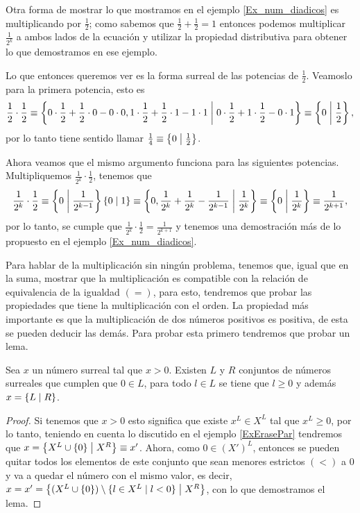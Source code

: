     \begin{example}
        Otra forma de mostrar lo que mostramos en el ejemplo \ref{Ex_num_diadicos} es multiplicando por $\frac{1}{2}$; como sabemos que $\frac{1}{2}+\frac{1}{2} = 1$ entonces podemos multiplicar $\frac{1}{2^k}$ a ambos lados de la ecuaci\'on y utilizar la propiedad distributiva para obtener lo que demostramos en ese ejemplo.

        Lo que entonces queremos ver es la forma surreal de las potencias de $\frac{1}{2}$. Veamoslo para la primera potencia, esto es
        \[
            \frac{1}{2}\cdot\frac{1}{2} \equiv \left\{0\cdot\frac{1}{2} + \frac{1}{2}\cdot 0 - 0\cdot 0, 1\cdot \frac{1}{2} +\frac{1}{2}\cdot 1 - 1\cdot 1\;\middle|\; 0\cdot \frac{1}{2} + 1\cdot \frac{1}{2} - 0\cdot 1\right\} \equiv \left\{0\;\middle|\; \frac{1}{2}\right\},
        \]
        por lo tanto tiene sentido llamar $\frac{1}{4}\equiv \left\{0\;\middle|\; \frac{1}{2}\right\}$.

        Ahora veamos que el mismo argumento funciona para las siguientes potencias. Multipliquemos $\frac{1}{2^k}\cdot \frac{1}{2}$, tenemos que 
        \[
            \frac{1}{2^k}\cdot \frac{1}{2} \equiv \left\{0\;\middle|\; \frac{1}{2^{k-1}}\right\}\left\{0\;\middle|\; 1\right\} \equiv \left\{0, \frac{1}{2^{k}} + \frac{1}{2^{k}} - \frac{1}{2^{k-1}}\;\middle|\; \frac{1}{2^{k}}\right\}\equiv \left\{0\;\middle|\; \frac{1}{2^{k}}\right\}\equiv \frac{1}{2^{k+1}},
        \]
        por lo tanto, se cumple que $\frac{1}{2^k}\cdot \frac{1}{2} = \frac{1}{2^{k+1}}$ y tenemos una demostraci\'on m\'as de lo propuesto en el ejemplo \ref{Ex_num_diadicos}.
    \end{example}

    Para hablar de la multiplicaci\'on sin ning\'un problema, tenemos que, igual que en la suma, mostrar que la multiplicaci\'on es compatible con la relaci\'on de equivalencia de la igualdad $(=)$, para esto, tendremos que probar las propiedades que tiene la multiplicaci\'on con el orden. La propiedad m\'as importante es que la multiplicaci\'on de dos n\'umeros positivos es positiva, de esta se pueden deducir las dem\'as. Para probar esta primero tendremos que probar un lema.

    \begin{lemma}
        \label{normalize_positive_number}
        Sea $x$ un n\'umero surreal tal que $x > 0$. Existen $L$ y $R$ conjuntos de n\'umeros surreales que cumplen que $0\in L$, para todo $l\in L$ se tiene que $l \ge 0$ y adem\'as $x = \left\{L\;\middle|\; R\right\}$.
    \end{lemma}

    \begin{proof}
        Si tenemos que $x > 0$ esto significa que existe $x^L\in X^L$ tal que $x^L \ge 0$, por lo tanto, teniendo en cuenta lo discutido en el ejemplo \ref*{ExErasePar} tendremos que $x = \left\{X^L\cup \{0\}\;\middle|\; X^R\right\} \equiv x'$. Ahora, como $0\in (X')^L$, entonces se pueden quitar todos los elementos de este conjunto que sean menores estrictos $(<)$ a $0$ y va a quedar el n\'umero con el mismo valor, es decir, $x = x' = \left\{(X^L\cup \{0\})\setminus\{l\in X^L\;|\;l < 0\}\;\middle|\; X^R\right\}$, con lo que demostramos el lema.

    \end{proof}

